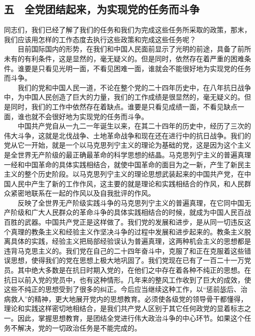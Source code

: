 \documentclass[cn,11pt,chinese]{elegantbook}
\def\myformat#1{\hfil\hfil #1}
\begin{document}
\subsection*{\myformat{五　全党团结起来，为实现党的任务而斗争}}
同志们，我们已经了解了我们的任务和我们为完成这些任务所采取的政策，那末，我们应该用怎样的工作态度去执行这些政策和完成这些任务呢？\\
　　目前国际国内的形势，在我们和中国人民面前显示了光明的前途，具备了前所未有的有利条件，这是显然的，毫无疑义的。但是同时，依然存在着严重的困难条件。谁要是只看见光明一面，不看见困难一面，谁就会不能很好地为实现党的任务而斗争。\\
　　我们的党和中国人民一道，不论在整个党的二十四年历史中，在八年抗日战争中，为中国人民创造了巨大的力量，我们的工作成绩是很显然的，毫无疑义的。但是同时，我们的工作中依然存在着缺点。谁要是只看见成绩一面，不看见缺点一面，谁也就不会很好地为实现党的任务而斗争。\\
　　中国共产党自从一九二一年诞生以来，在其二十四年的历史中，经历了三次的伟大斗争，这就是北伐战争、土地革命战争和现在还在进行中的抗日战争。我们的党从它一开始，就是一个以马克思列宁主义的理论为基础的党，这是因为这个主义是全世界无产阶级的最正确最革命的科学思想的结晶。马克思列宁主义的普遍真理一经和中国革命的具体实践相结合，就使中国革命的面目为之一新，产生了新民主主义的整个历史阶段。以马克思列宁主义的理论思想武装起来的中国共产党，在中国人民中产生了新的工作作风，这主要的就是理论和实践相结合的作风，和人民群众紧密地联系在一起的作风以及自我批评的作风。\\
　　反映了全世界无产阶级实践斗争的马克思列宁主义的普遍真理，在它同中国无产阶级和广大人民群众的革命斗争的具体实践相结合的时候，就成为中国人民百战百胜的武器。中国共产党正是这样做了。我们党的发展和进步，是从同一切违反这个真理的教条主义和经验主义作坚决斗争的过程中发展和进步起来的。教条主义脱离具体的实践，经验主义把局部经验误认为普遍真理，这两种机会主义的思想都是违背马克思主义的。我们党在自己的二十四年奋斗中，克服了和正在克服着这些错误思想，使得我们的党在思想上极大地巩固了。我们党现在已有了一百二十一万党员。其中绝大多数是在抗日时期入党的，在他们之中存在着各种不纯正的思想。在抗日以前入党的党员中，也有这种情形。几年来的整风工作收到了巨大的成效，使这些不纯正的思想受到了很多的纠正。今后应当继续这种工作，以“惩前毖后、治病救人”的精神，更大地展开党内的思想教育。必须使各级党的领导骨干都懂得，理论和实践这样密切地相结合，是我们共产党人区别于其它任何政党的显着标志之一。因此，掌握思想教育，是团结全党进行伟大政治斗争的中心环节。如果这个任务不解决，党的一切政治任务是不能完成的。\\
\end{document}
